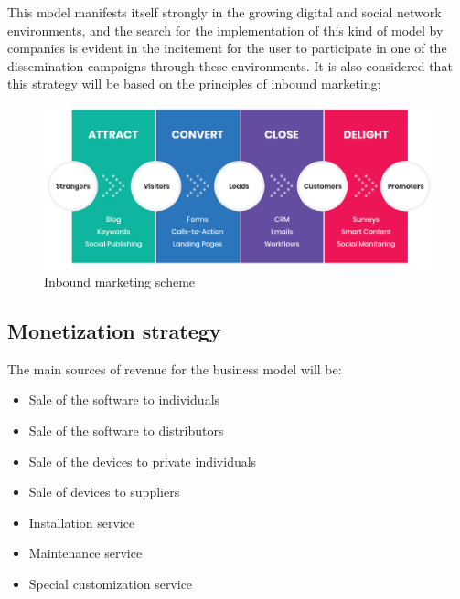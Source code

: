 \documentclass[11pt,a4paper]{article}
\begin{document}
\newpage

This model manifests itself strongly in the growing digital and social network environments, and the search for the implementation of this kind of model by companies is evident in the incitement for the user to participate in one of the dissemination campaigns through these environments. It is also considered that this strategy will be based on the principles of inbound marketing:\\
\begin{figure}[hbtp]
\centering
\includegraphics[scale=1]{marketing.png}
\caption{Inbound marketing scheme}
\end{figure}

\subsection{Monetization strategy}
The main sources of revenue for the business model will be: 
\begin{itemize}
\item Sale of the software to individuals
\item Sale of the software to distributors
\item Sale of the devices to private individuals
\item Sale of devices to suppliers
\item Installation service
\item Maintenance service
\item Special customization service
\end{itemize}
\end{document}

